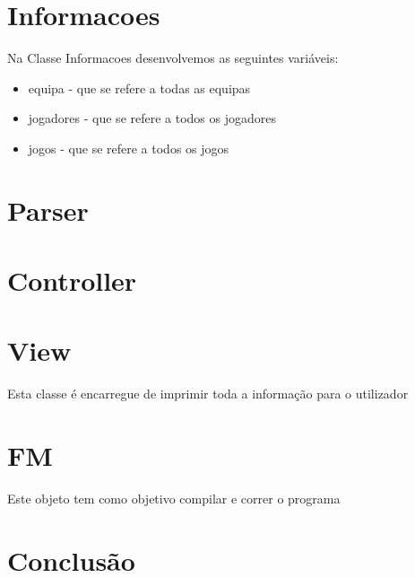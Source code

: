 \documentclass[a4paper,12pt]{article}
\begin{document}
\section{Informacoes}
    Na Classe Informacoes desenvolvemos as seguintes variáveis:
    \begin{itemize}
        \item equipa - que se refere a todas as equipas
        \item jogadores - que se refere a todos os jogadores
        \item jogos - que se refere a todos os jogos
    \end{itemize}


\section{Parser}

\section{Controller}

\section{View}
    Esta classe é encarregue de imprimir toda a informação para o utilizador

\section{FM}
    Este objeto tem como objetivo compilar e correr o programa
\section{Conclusão}
\end{document}
